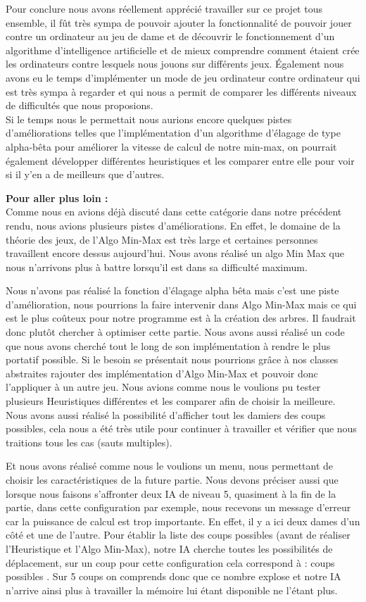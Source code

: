 \documentclass[12,french]{report}
\begin{document}
Pour conclure nous avons réellement apprécié travailler sur ce projet tous ensemble, il fût très sympa de pouvoir ajouter la fonctionnalité de pouvoir jouer contre un ordinateur au jeu de dame et de découvrir le fonctionnement d'un algorithme d'intelligence artificielle et de mieux comprendre comment étaient crée les ordinateurs contre lesquels nous jouons sur différents jeux. Également nous avons eu le temps d'implémenter un mode de jeu ordinateur contre ordinateur qui est très sympa à regarder et qui nous a permit de comparer les différents niveaux de difficultés que nous proposions.\\
Si le temps nous le permettait nous aurions encore quelques pistes d'améliorations telles que l'implémentation d'un algorithme d'élagage de type alpha-bêta pour améliorer la vitesse de calcul de notre min-max, on pourrait également développer différentes heuristiques et les comparer entre elle pour voir si il y'en a de meilleurs que d'autres.


\textbf{Pour aller plus loin :} \\

Comme nous en avions déjà discuté dans cette catégorie dans notre précédent rendu, nous avions plusieurs pistes d'améliorations. En effet, le domaine de la théorie des jeux, de l'Algo Min-Max est très large et certaines personnes travaillent encore dessus aujourd'hui. Nous avons réalisé un algo Min Max que nous n'arrivons plus à battre lorsqu'il est dans sa difficulté maximum. 

Nous n'avons pas réalisé la fonction d'élagage alpha bêta mais c'est une piste d'amélioration, nous pourrions la faire intervenir dans Algo Min-Max mais ce qui est le plus coûteux pour notre programme est à la création des arbres. Il faudrait donc plutôt chercher à optimiser cette partie. 
Nous avons aussi réalisé un code que nous avons cherché tout le long de son implémentation à rendre le plus portatif possible. Si le besoin se présentait nous pourrions grâce à nos classes abstraites rajouter des implémentation d'Algo Min-Max et pouvoir donc l'appliquer à un autre jeu.
Nous avions comme nous le voulions pu tester plusieurs Heuristiques différentes et les comparer afin de choisir la meilleure.
Nous avons aussi réalisé la possibilité d'afficher tout les damiers des coups possibles, cela nous a été très utile pour continuer à travailler et vérifier que nous traitions tous les cas (sauts multiples).

Et nous avons réalisé comme nous le voulions un menu, nous permettant de choisir les caractéristiques de la future partie.
Nous devons préciser aussi que lorsque nous faisons s'affronter deux IA de niveau 5, quasiment à la fin de la partie, dans cette configuration par exemple, nous recevons un message d'erreur car la puissance de calcul est trop importante. En effet, il y a ici deux dames d'un côté et une de l'autre. Pour établir la liste des coups possibles (avant de réaliser l'Heuristique et l'Algo Min-Max), notre IA cherche toutes les possibilités de déplacement, sur un coup pour cette configuration cela correspond à : coups possibles . Sur 5 coups on comprends donc que ce nombre explose et notre IA n'arrive ainsi plus à travailler la mémoire lui étant disponible ne l'étant plus.
\end{document}
